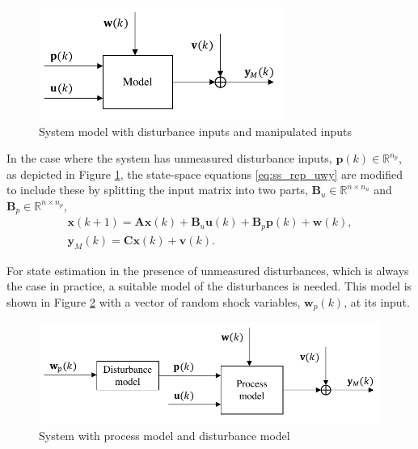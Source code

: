 {{\begin{figure}[ht]
	\centering
	\includegraphics[width=8cm]{images/model_diag_upwvy.pdf}
	\caption{System model with disturbance inputs and manipulated inputs}
	\label{fig:model_diag_upwvy}
\end{figure}
In the case where the system has unmeasured disturbance inputs, $\mathbf{p}(k) \in \mathbb{R}^{n_p}$, as depicted in Figure \ref{fig:model_diag_upwvy}, the state-space equations \eqref{eq:ss_rep_uwy} are modified to include these by splitting the input matrix into two parts, $\mathbf{B}_u \in \mathbb{R}^{n \times n_u}$ and $\mathbf{B}_p \in \mathbb{R}^{n \times n_p}$,
\begin{equation} \label{eq:ss_rep_upwy}
	\begin{aligned}
		\mathbf{x}(k+1) = \mathbf{A} \mathbf{x}(k) + \mathbf{B}_u \mathbf{u}(k) + \mathbf{B}_p \mathbf{p}(k) + \mathbf{w}(k), \\
		\mathbf{y}_M(k) = \mathbf{C} \mathbf{x}(k) + \mathbf{v}(k).
	\end{aligned}
\end{equation}

For state estimation in the presence of unmeasured disturbances, which is always the case in practice, a suitable model of the disturbances is needed. This model is shown in Figure \ref{fig:model_diag_wpupwvy} with a vector of random shock variables, $\mathbf{w}_p(k)$, at its input.
%
\begin{figure}[ht]
	\centering
	\includegraphics[width=12.5cm]{images/model_diag_wpupwvy.pdf}
	\caption{System with process model and disturbance model}
	\label{fig:model_diag_wpupwvy}
\end{figure}

}}
